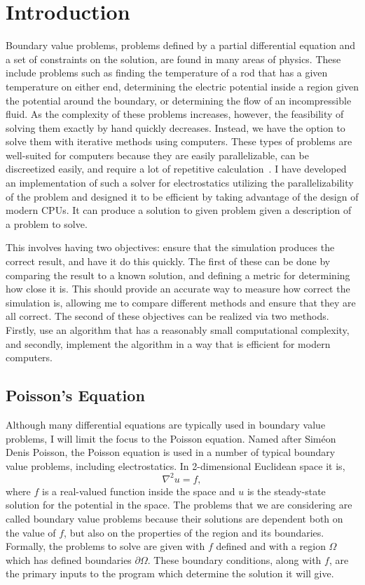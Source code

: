 \section{Introduction}

Boundary value problems, problems defined by a partial differential equation and a set of
constraints on the solution, are found in many areas of physics. These include problems
such as finding the temperature of a rod that has a given temperature on either end,
determining the electric potential inside a region given the potential around the
boundary, or determining the flow of an incompressible fluid. As the complexity of 
these problems increases, however, the feasibility of solving them exactly by hand
quickly decreases. Instead, we have the option to solve them with iterative methods
using computers. These types of problems are well-suited for computers because
they are easily parallelizable, can be discreetized easily, and require a lot of repetitive calculation~\cite{parallel}. I have developed an
implementation of such a solver for electrostatics utilizing the 
parallelizability of the problem and designed it to be efficient by taking advantage 
of the design of modern CPUs. It can produce a solution to given problem given a description
of a problem to solve.

This involves having two objectives: ensure that the simulation produces the correct
result, and have it do this quickly. The first of these can be done by comparing the
result to a known solution, and defining a metric for determining how close it is.
This should provide an accurate way to measure how correct the simulation is, allowing
me to compare different methods and ensure that they are all correct.
The second of these objectives can be realized via two methods. Firstly, use an
algorithm that has a reasonably small computational complexity, and secondly,
implement the algorithm in a way that is efficient for modern computers.

\subsection{Poisson's Equation}

Although many differential equations are typically used in boundary value problems,
I will limit the focus to the Poisson equation. Named after Siméon Denis Poisson, the Poisson equation
is used in a number of typical boundary value problems, including electrostatics.
In 2-dimensional Euclidean space it is\cite{boas},
$$\nabla^2 u = f,$$
where $f$ is a real-valued function inside the space and $u$ is the steady-state
solution for the potential in the space. The problems that we are considering are called boundary value problems
because their solutions are dependent both on the value of $f$, but also on the properties of the region and its boundaries.
Formally, the problems to solve are given with $f$ defined and with a region $\Omega$ which has defined boundaries
$\partial\Omega$. These boundary conditions, along with $f$, are the primary inputs to the program which determine
the solution it will give.

